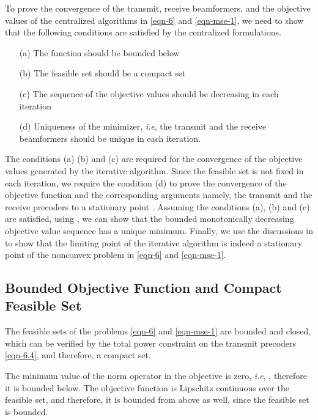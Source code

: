 To prove the convergence of the transmit, receive beamformers, and the objective values of the centralized algorithms in \eqref{eqn-6} and \eqref{eqn-mse-1}, we need to show that the following conditions are satisfied by the centralized formulations.
\begin{itemize}
	\item[(a)] The function should be bounded below
	\item[(b)] The feasible set should be a compact set
	\item[(c)] The sequence of the objective values should be decreasing in each iteration
	\item[(d)] Uniqueness of the minimizer, \textit{i.e}, the transmit and the receive beamformers should be unique in each iteration.
\end{itemize}
The conditions (a) (b) and (c) are required for the convergence of the objective values generated by the iterative algorithm. Since the feasible set is not fixed in each iteration, we require the condition (d) to prove the convergence of the objective function and the corresponding arguments namely, the transmit and the receive precoders to a stationary point \cite{meyer1976sufficient}. Assuming the conditions (a), (b) and (c) are satisfied, using \cite[Th. 3.14]{rudin1964principles}, we can show that the bounded monotonically decreasing objective value sequence has a unique minimum. Finally, we use the discussions in \cite{marks1978technical,lanckriet2009convergence,scutari_1} to show that the limiting point of the iterative algorithm is indeed a stationary point of the nonconvex problem in \eqref{eqn-6} and \eqref{eqn-mse-1}.

\subsection{Bounded Objective Function and Compact Feasible Set}
The feasible sets of the problems \eqref{eqn-6} and \eqref{eqn-mse-1} are bounded and closed, which can be verified by the total power constraint on the transmit precoders \eqref{eqn-6.4}, and therefore, a compact set. 

The minimum value of the norm operator in the objective is zero, \textit{i.e}, , therefore it is bounded below. The objective function is Lipschitz continuous over the feasible set, and therefore, it is bounded from above as well, since the feasible set is bounded. %

